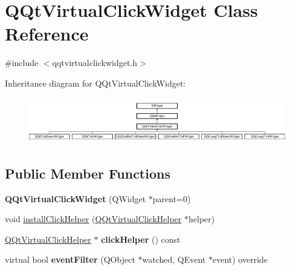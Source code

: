 \hypertarget{class_q_qt_virtual_click_widget}{}\section{Q\+Qt\+Virtual\+Click\+Widget Class Reference}
\label{class_q_qt_virtual_click_widget}


{\ttfamily \#include $<$qqtvirtualclickwidget.\+h$>$}

Inheritance diagram for Q\+Qt\+Virtual\+Click\+Widget\+:\begin{figure}[H]
\begin{center}
\leavevmode
\includegraphics[height=2.018018cm]{class_q_qt_virtual_click_widget}
\end{center}
\end{figure}
\subsection*{Public Member Functions}
\begin{DoxyCompactItemize}
\item 
\mbox{\label{class_q_qt_virtual_click_widget_adca90fa2a922fded6ed3e559ee8a070f}} 
{\bfseries Q\+Qt\+Virtual\+Click\+Widget} (Q\+Widget $\ast$parent=0)
\item 
void \mbox{\hyperlink{class_q_qt_virtual_click_widget_a9c406a5a5b2a82cd2709453cf4e5be89}{install\+Click\+Helper}} (\mbox{\hyperlink{class_q_qt_virtual_click_helper}{Q\+Qt\+Virtual\+Click\+Helper}} $\ast$helper)
\item 
\mbox{\label{class_q_qt_virtual_click_widget_ab076aa2db2462b6708d340f255704b86}} 
\mbox{\hyperlink{class_q_qt_virtual_click_helper}{Q\+Qt\+Virtual\+Click\+Helper}} $\ast$ {\bfseries click\+Helper} () const
\item 
\mbox{\label{class_q_qt_virtual_click_widget_a5ce878b256197a961f626095125a1511}} 
virtual bool {\bfseries event\+Filter} (Q\+Object $\ast$watched, Q\+Event $\ast$event) override
\end{DoxyCompactItemize}
